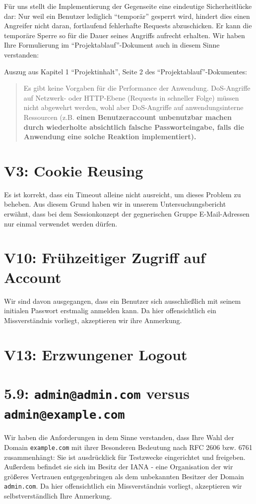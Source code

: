 \documentclass[12pt,DIV14,BCOR10mm,a4paper,parskip=half-,headsepline,headinclude,english,ngerman,bibliography=totocnumbered]{scrreprt}
\begin{document}
Für uns stellt die Implementierung der Gegenseite eine eindeutige Sicherheitlücke dar: Nur weil ein Benutzer lediglich \enquote{temporär} gesperrt wird, hindert dies einen Angreifer nicht daran, fortlaufend fehlerhafte Requests abzuschicken. Er kann die temporäre Sperre so für die Dauer seines Angriffs aufrecht erhalten. Wir haben Ihre Formulierung im \enquote{Projektablauf}-Dokument auch in diesem Sinne verstanden:

Auszug aus Kapitel 1 \enquote{Projektinhalt}, Seite 2 des \enquote{Projektablauf}-Dokumentes:

\blockquote{
Es gibt keine Vorgaben für die Performance der Anwendung. DoS-Angriffe auf Netzwerk- oder HTTP-Ebene (Requests in schneller Folge) müssen nicht abgewehrt werden, wohl aber DoS-Angriffe auf anwendungsinterne Ressourcen (z.B. \textbf{einen Benutzeraccount unbenutzbar machen durch wiederholte absichtlich falsche Passworteingabe, falls die Anwendung eine solche Reaktion implementiert).}
}

\section{V3: Cookie Reusing}

Es ist korrekt, dass ein Timeout alleine nicht ausreicht, um dieses Problem zu beheben.
Aus diesem Grund haben wir in unserem Untersuchungsbericht erwähnt, dass bei dem Sessionkonzept der gegnerischen Gruppe E-Mail-Adressen nur einmal verwendet werden dürfen.

\section{V10: Frühzeitiger Zugriff auf Account}

Wir sind davon ausgegangen, dass ein Benutzer sich ausschließlich mit seinem initialen Passwort erstmalig anmelden kann.
Da hier offensichtlich ein Missverständnis vorliegt, akzeptieren wir ihre Anmerkung.

\section{V13: Erzwungener Logout}

\section{5.9: \texttt{admin@admin.com} versus \texttt{admin@example.com}}

Wir haben die Anforderungen in dem Sinne verstanden, dass Ihre Wahl der Domain \texttt{example.com} mit ihrer Besonderen Bedeutung nach RFC 2606 bzw. 6761 zusammenhängt: Sie ist ausdrücklick für Testzwecke eingerichtet und freigeben. Außerdem befindet sie sich im Besitz der IANA - eine Organisation der wir größeres Vertrauen entgegenbringen als dem unbekannten Besitzer der Domain \texttt{admin.com}.
Da hier offensichtlich ein Missverständnis vorliegt, akzeptieren wir selbstverständlich Ihre Anmerkung.
\end{document}
